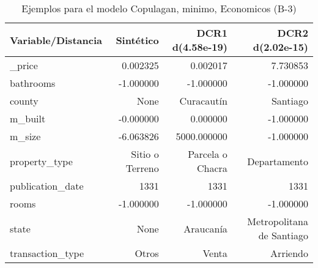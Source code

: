 \begin{table}[H]
\centering
\fontsize{10}{14}\selectfont
\caption{Ejemplos para el modelo Copulagan, minimo, Economicos (B-3)}
\label{table-example-economicos-b-3-copulagan-min}
\begin{tabular}{|l|r|r|r|}
\hline
\rowcolor[gray]{0.8}
Variable/Distancia & Sintético & DCR1 d(4.58e-19) & DCR2 d(2.02e-15) \\
\hline \_price & \cellcolor[rgb]{0.9, 0.54, 0.52} 0.002325 & \cellcolor[rgb]{0.9, 0.54, 0.52} 0.002017 & 7.730853 \\
\hline bathrooms & \cellcolor[rgb]{0.9, 0.54, 0.52} -1.000000 & \cellcolor[rgb]{0.9, 0.54, 0.52} -1.000000 & \cellcolor[rgb]{0.9, 0.54, 0.52} -1.000000 \\
\hline county & \cellcolor[rgb]{0.9, 0.54, 0.52} None & Curacautín & Santiago \\
\hline m\_built & \cellcolor[rgb]{0.9, 0.54, 0.52} -0.000000 & \cellcolor[rgb]{0.9, 0.54, 0.52} 0.000000 & \cellcolor[rgb]{0.9, 0.54, 0.52} -1.000000 \\
\hline m\_size & \cellcolor[rgb]{0.9, 0.54, 0.52} -6.063826 & 5000.000000 & \cellcolor[rgb]{0.9, 0.54, 0.52} -1.000000 \\
\hline property\_type & \cellcolor[rgb]{0.9, 0.54, 0.52} Sitio o Terreno & Parcela o Chacra & Departamento \\
\hline publication\_date & \cellcolor[rgb]{0.9, 0.54, 0.52} 1331 & \cellcolor[rgb]{0.9, 0.54, 0.52} 1331 & \cellcolor[rgb]{0.9, 0.54, 0.52} 1331 \\
\hline rooms & \cellcolor[rgb]{0.9, 0.54, 0.52} -1.000000 & \cellcolor[rgb]{0.9, 0.54, 0.52} -1.000000 & \cellcolor[rgb]{0.9, 0.54, 0.52} -1.000000 \\
\hline state & \cellcolor[rgb]{0.9, 0.54, 0.52} None & Araucanía & Metropolitana de Santiago \\
\hline transaction\_type & \cellcolor[rgb]{0.9, 0.54, 0.52} Otros & Venta & Arriendo \\
\hline
\end{tabular}
\end{table}
